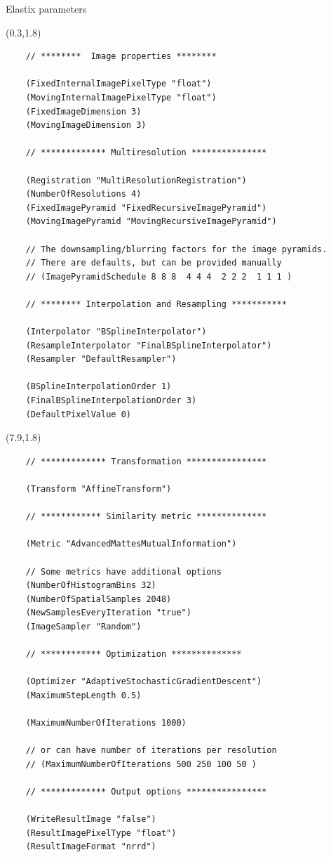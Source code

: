 \documentclass[aspectratio=169]{beamer}
\begin{document}
\begin{frame}[fragile]{Elastix parameters}

    \begin{textblock}{6}(0.3,1.8)
    \tiny
    \begin{lstlisting}
    // ********  Image properties ********  

    (FixedInternalImagePixelType "float")
    (MovingInternalImagePixelType "float")
    (FixedImageDimension 3)
    (MovingImageDimension 3)

    // ************* Multiresolution ***************

    (Registration "MultiResolutionRegistration")
    (NumberOfResolutions 4)
    (FixedImagePyramid "FixedRecursiveImagePyramid")
    (MovingImagePyramid "MovingRecursiveImagePyramid")

    // The downsampling/blurring factors for the image pyramids.
    // There are defaults, but can be provided manually
    // (ImagePyramidSchedule 8 8 8  4 4 4  2 2 2  1 1 1 )

    // ******** Interpolation and Resampling ***********

    (Interpolator "BSplineInterpolator")
    (ResampleInterpolator "FinalBSplineInterpolator")
    (Resampler "DefaultResampler")

    (BSplineInterpolationOrder 1)
    (FinalBSplineInterpolationOrder 3)
    (DefaultPixelValue 0)

    \end{lstlisting}
    \end{textblock}

    \begin{textblock}{6}(7.9,1.8)
    \tiny
    \begin{lstlisting}
    // ************* Transformation ****************

    (Transform "AffineTransform")

    // ************ Similarity metric **************

    (Metric "AdvancedMattesMutualInformation")

    // Some metrics have additional options
    (NumberOfHistogramBins 32)
    (NumberOfSpatialSamples 2048)
    (NewSamplesEveryIteration "true")
    (ImageSampler "Random")

    // ************ Optimization **************

    (Optimizer "AdaptiveStochasticGradientDescent")
    (MaximumStepLength 0.5)

    (MaximumNumberOfIterations 1000)

    // or can have number of iterations per resolution
    // (MaximumNumberOfIterations 500 250 100 50 )

    // ************* Output options ****************

    (WriteResultImage "false")
    (ResultImagePixelType "float")
    (ResultImageFormat "nrrd")

    \end{lstlisting}
    \end{textblock}

\end{frame}
\end{document}
